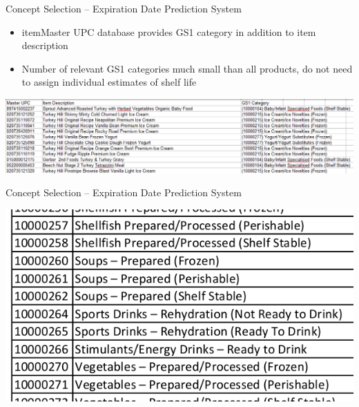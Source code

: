 \documentclass[t]{beamer}
\begin{document}
\begin{frame}{Concept Selection -- Expiration Date Prediction System}
\begin{itemize}
\item itemMaster UPC database provides GS1 category in addition to item description
\item Number of relevant GS1 categories much small than all products, do not need to assign individual estimates of shelf life
\end{itemize}
\begin{center}
\includegraphics[scale=0.3]{../Graphics/itemMaster}
\end{center}
\end{frame}

\begin{frame}{Concept Selection -- Expiration Date Prediction System}
\begin{center}
\includegraphics[scale=0.5]{../Graphics/gs1}
\end{center}
\end{frame}
\end{document}
